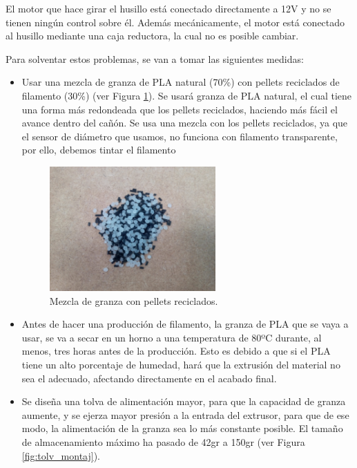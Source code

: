 El motor que hace girar el husillo está conectado directamente a 12V y no se tienen ningún control sobre él. Además mecánicamente, el motor está conectado al husillo mediante una caja reductora, la cual no es posible cambiar.

Para solventar estos problemas, se van a tomar las siguientes medidas:

\begin{itemize}
    \item{Usar una mezcla de granza de PLA natural (70\%) con pellets reciclados de filamento (30\%) (ver Figura \ref{fig:2007105-mezc}). Se usará granza de PLA natural, el cual tiene una forma más redondeada que los pellets reciclados, haciendo más fácil el avance dentro del cañón. Se usa una mezcla con los pellets reciclados, ya que el sensor de diámetro que usamos, no funciona con filamento transparente, por ello, debemos tintar el filamento}
	    \begin{figure}[H]
		    \centering
		    \includegraphics[width=0.6\textwidth]{images/producciones/20072015/IMG_20150903_155859.jpg}
		    \caption{Mezcla de granza con pellets reciclados.}
		    \label{fig:2007105-mezc}
		\end{figure}
    \item{Antes de hacer una producción de filamento, la granza de PLA que se vaya a usar, se va a secar en un horno a una temperatura de 80ºC durante, al menos, tres horas antes de la producción. Esto es debido a que si el PLA tiene un alto porcentaje de humedad, hará que la extrusión del material no sea el adecuado, afectando directamente en el acabado final.}
    \item{Se diseña una tolva de alimentación mayor, para que la capacidad de granza aumente, y se ejerza mayor presión a la entrada del extrusor, para que de ese modo, la alimentación de la granza sea lo más constante posible. El tamaño de almacenamiento máximo ha pasado de 42gr a 150gr (ver Figura \ref{fig:tolv_montaj}).}
\end{itemize}

